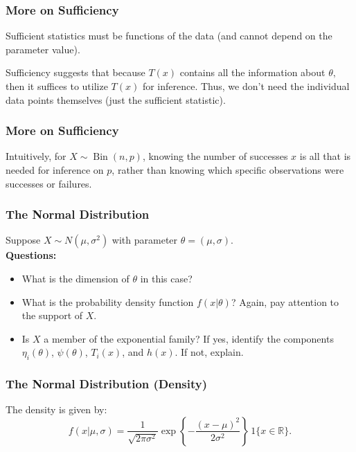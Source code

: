 \documentclass{beamer}
\begin{document}
\begin{frame}
\frametitle{More on Sufficiency}
Sufficient statistics must be functions of the data (and cannot depend on the parameter value). 

\vspace*{1em}

Sufficiency suggests that because $T(x)$ contains all the information about $\theta,$ then it suffices to utilize $T(x)$ for inference. Thus, we don't need the individual data points themselves (just the sufficient statistic). 
\end{frame}


\begin{frame}
\frametitle{More on Sufficiency}
Intuitively, for $X \sim \operatorname{Bin}(n,p)$, knowing the number of successes $x$ is all that is needed for inference on $p$, rather than knowing which specific observations were successes or failures.
\end{frame}

\begin{frame}
\frametitle{The Normal Distribution}
Suppose $X \sim N(\mu, \sigma^2)$ with parameter $\theta=(\mu,\sigma)$.\\[1em]
\textbf{Questions:}
\begin{itemize}
  \item What is the dimension of $\theta$ in this case?
  \item What is the probability density function $f(x|\theta)$? Again, pay attention to the support of $X.$
  \item Is $X$ a member of the exponential family? If yes, identify the components $\eta_i(\theta)$, $\psi(\theta)$, $T_i(x)$, and $h(x)$. If not, explain.
\end{itemize}
\end{frame}

\begin{frame}
\frametitle{The Normal Distribution (Density)}
The density is given by:
\[
f(x|\mu,\sigma) = \frac{1}{\sqrt{2\pi\sigma^2}} \exp\left\{-\frac{(x-\mu)^2}{2\sigma^2}\right\} \, 1\{x \in \mathbb{R}\}.
\]
\end{frame}
\end{document}
